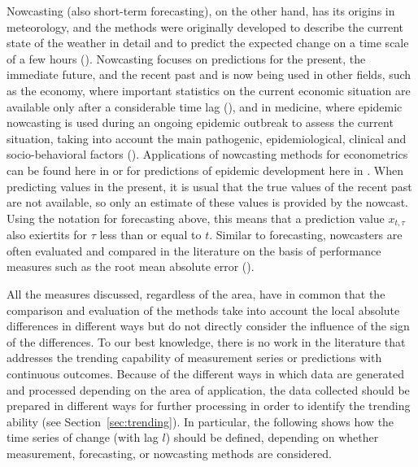 Nowcasting (also short-term forecasting), on the other hand, has its origins in meteorology, and the methods were originally developed to describe the current state of the weather in detail and to predict the expected change on a time scale of a few hours (\cite{browning1989nowcasting,schmid2019nowcasting}).
Nowcasting focuses on predictions for the present, the immediate future, and the recent past and is now being used in other fields, such as the economy, where important statistics on the current economic situation are available only after a considerable time lag (\cite{banbura2013now}), and in medicine, where epidemic nowcasting is used during an ongoing epidemic outbreak to assess the current situation, taking into account the main pathogenic, epidemiological, clinical and socio-behavioral factors (\cite{wu2021nowcasting}). 
Applications of nowcasting methods for econometrics can be found here in \cite{giannone2006nowcasting,fornaro2020nowcasting,bok2018macroeconomic} or for predictions of epidemic development here in \cite{johansson2014nowcasting,gunther2021nowcasting,birrell2021real}. 
When predicting values in the present, it is usual that the true values of the recent past are not available, so only an estimate of these values is provided by the nowcast.
Using the notation for forecasting above, this means that a prediction value $x_{t,\tau}$ also exiertits  for $\tau$ less than or equal to $t$.
Similar to forecasting, nowcasters are often evaluated and compared in the literature on the basis of performance measures such as the root mean absolute error (\cite{gunther2021nowcasting}).

All the measures discussed, regardless of the area, have in common that the comparison and evaluation of the methods take into account the local absolute differences in different ways but do not directly consider the influence of the sign of the differences. 
To our best knowledge, there is no work in the literature that addresses the trending capability of measurement series or predictions with continuous outcomes.
Because of the different ways in which data are generated and processed depending on the area of application, the data collected should be prepared in different ways for further processing in order to identify the trending ability (see Section~\ref{sec:trending}). 
In particular, the following shows how the time series of change (with lag $l$) should be defined, depending on whether measurement, forecasting, or nowcasting methods are considered.


